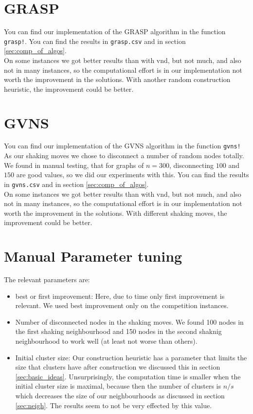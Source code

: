 \section{GRASP}

You can find our implementation of the GRASP algorithm in the function \texttt{grasp!}. You can find the results in \texttt{grasp.csv} and in section \ref{sec:comp_of_algos}.\\
On some instances we got better results than with vnd, but not much, and also not in many instances, so the computational effort is in our implementation not worth the improvement in the solutions. With another random construction heuristic, the improvement could be better.\\


\section{GVNS}
You can find our implementation of the GVNS algorithm in the function \texttt{gvns!}
As our shaking moves we chose to disconnect a number of random nodes totally. We found in manual testing, that for graphs of $n=300$, disconnecting $100$ and $150$ are good values, so we did our experiments with this. You can find the results in \texttt{gvns.csv} and in section \ref{sec:comp_of_algos}.\\
On some instances we got better results than with vnd, but not much, and also not in many instances, so the computational effort is in our implementation not worth the improvement in the solutions. With different shaking moves, the improvement could be better.\\

\pagebreak

\section{Manual Parameter tuning}

The relevant parameters are:
\begin{itemize}
    \item best or first improvement: Here, due to time only first improvement is relevant. We used best improvement only on the competition instances.
    \item Number of disconnected nodes in the shaking moves. We found 100 nodes in the first shaking neighbourhood and 150 nodes in the second shaknig neighbourhood to work well (at least not worse than others).
    \item Initial cluster size: Our construction heuristic has a parameter that limits the size that clusters have after construction we discussed this in section \ref{sec:basic_ideas}. Unsurprisingly, the computation time is smaller when the initial cluster size is maximal, because then the number of clusters is $n/s$ which decreases the size of our neighbourhoods as discussed in section \ref{sec:neigh}. The results seem to not be very effected by this value.
\end{itemize}
